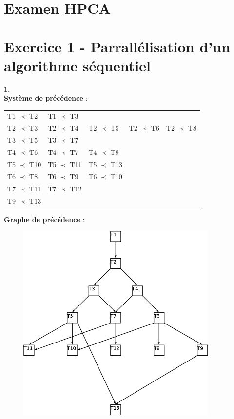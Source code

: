 \documentclass{article}
\begin{document}
\section*{Examen HPCA}\label{sec:name}

\section*{Exercice 1 - Parrall\'elisation d'un algorithme s\'equentiel}\label{sec:name}

\textbf{1.} \\

\textbf{Syst\`eme de pr\'ec\'edence} :
\begin{table}[h]
\begin{tabular}{lllll}
T1 $\prec$ T2  & T1 $\prec$ T3  &                &               &               \\
T2 $\prec$ T3  & T2 $\prec$ T4  & T2 $\prec$ T5  & T2 $\prec$ T6 & T2 $\prec$ T8 \\
T3 $\prec$ T5  & T3 $\prec$ T7  &                &               &               \\
T4 $\prec$ T6  & T4 $\prec$ T7  & T4 $\prec$ T9  &               &               \\
T5 $\prec$ T10 & T5 $\prec$ T11 & T5 $\prec$ T13 &               &               \\
T6 $\prec$ T8  & T6 $\prec$ T9  & T6 $\prec$ T10 &               &               \\
T7 $\prec$ T11 & T7 $\prec$ T12 &                &               &               \\
T9 $\prec$ T13 &                &                &               &
\end{tabular}
\end{table}

\textbf{Graphe de pr\'ec\'edence} :
\begin{figure}[!h]
    \centering
    \includegraphics[width=10cm]{graphePrec.png}
\end{figure}
\end{document}
